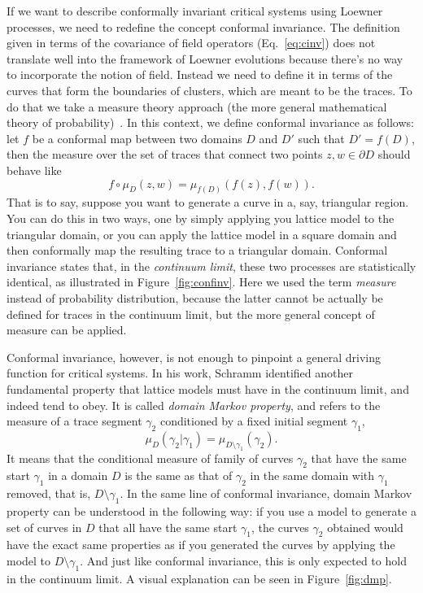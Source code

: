 If we want to describe conformally invariant critical systems using
Loewner processes, we need to redefine the concept conformal invariance. The
definition given in terms of the covariance of field operators
(Eq.~\ref{eq:cinv}) does not translate well into the framework of Loewner
evolutions because there's no way to incorporate the notion of field. Instead
we need to define it in terms of the curves that form the boundaries of
clusters, which are meant to be the traces. To do that we take a measure theory
approach (the more general mathematical theory of probability)~\cite{Ash2000}.
In this context, we define conformal invariance as follows: let $f$ be a
conformal map between two domains $D$ and $D'$ such that $D'=f(D)$, then the
measure over the set of traces that connect two points $z,w\in\partial D$
should behave like~\cite{Cardy2005}
\begin{equation}
    \newcommand{\pp}[1]{\left(#1\right)}
    f\circ\mu_D\pp{z,w} = \mu_{f(D)}\pp{f\pp{z}, f\pp{w}}.
\end{equation}
That is to say, suppose you want to generate a curve in a, say, triangular
region. You can do this in two ways, one by simply applying you lattice model
to the triangular domain, or you can apply the lattice model in a square domain
and then conformally map the resulting trace to a triangular domain. Conformal
invariance states that, in the \textit{continuum limit}, these two processes
are statistically identical, as illustrated in Figure~\ref{fig:confinv}. Here
we used the term \textit{measure} instead of probability distribution, because
the latter cannot be actually be defined for traces in the continuum limit, but
the more general concept of measure can be applied.

Conformal invariance, however, is not enough to pinpoint a general driving
function for critical systems. In his work, Schramm identified another
fundamental property that lattice models must have in the continuum limit, and
indeed tend to obey. It is called \textit{domain Markov property}, and refers
to the measure of a trace segment $\gamma_2$ conditioned by a
fixed initial segment $\gamma_1$,
\begin{equation}
    \newcommand{\pp}[1]{\left(#1\right)}
    \mu_D\pp{\gamma_2|\gamma_1} = \mu_{D\setminus\gamma_1}\pp{\gamma_2}.
\end{equation}
It means that the conditional measure of family of curves $\gamma_2$ that have the
same start $\gamma_1$ in a domain $D$ is the same as that of $\gamma_2$ in
the same domain with $\gamma_1$ removed, that is, $D\setminus\gamma_1$.
In the same line of conformal invariance, domain Markov property can be
understood in the following way: if you use a model to generate a set of curves
in $D$ that all have the same start $\gamma_1$, the curves $\gamma_2$ obtained
would have the exact same properties as if you generated the curves by applying
the model to $D\setminus\gamma_1$. And just like conformal invariance, this is
only expected to hold in the continuum limit. A visual explanation can be seen
in Figure~\ref{fig:dmp}.

